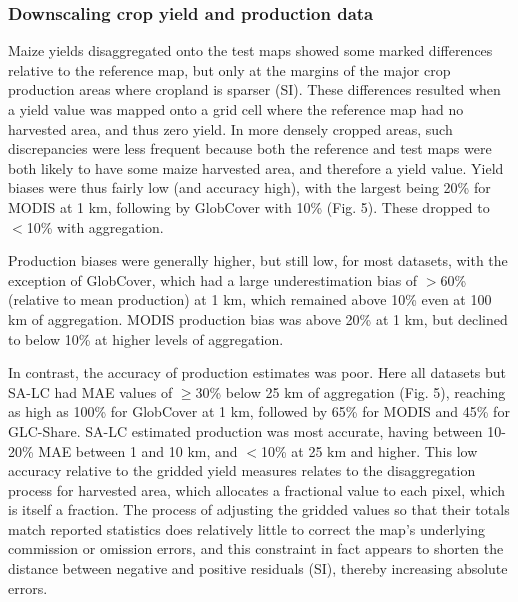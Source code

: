 \documentclass[12 pt, titlepage, a4paper]{article}
\begin{document}
\vspace{-0.3 cm}
\subsubsection*{Downscaling crop yield and production data}
\vspace{-0.2 cm}
Maize yields disaggregated onto the test maps showed some marked differences relative to the reference map, but only at the margins of the major crop production areas where cropland is sparser (SI). These differences resulted when a yield value was mapped onto a grid cell where the reference map had no harvested area, and thus zero yield. In more densely cropped areas, such discrepancies were less frequent because both the reference and test maps were both likely to have some maize harvested area, and therefore a yield value.  Yield biases were thus fairly low (and accuracy high), with the largest being 20\% for MODIS at 1 km, following by GlobCover with 10\% (Fig. 5). These dropped to $<$10\% with aggregation.  

Production biases were generally higher, but still low, for most datasets, with the exception of GlobCover, which had a large underestimation bias of $>$60\% (relative to mean production) at 1 km, which remained above 10\% even at 100 km of aggregation. MODIS production bias was above 20\% at 1 km, but declined to below 10\% at higher levels of aggregation.  

In contrast, the accuracy of production estimates was poor. Here all datasets but SA-LC had MAE values of $\geq$30\% below 25 km of aggregation (Fig. 5), reaching as high as 100\% for GlobCover at 1 km, followed by 65\% for MODIS and 45\% for GLC-Share. SA-LC estimated production was most accurate, having between 10-20\% MAE between 1 and 10 km, and $<$10\% at 25 km and higher.  This low accuracy relative to the gridded yield measures relates to the disaggregation process for harvested area, which allocates a fractional value to each pixel, which is itself a fraction. The process of adjusting the gridded values so that their totals match reported statistics does relatively little to correct the map's underlying commission or omission errors, and this constraint in fact appears to shorten the distance between negative and positive residuals (SI), thereby increasing absolute errors.  
\end{document}
